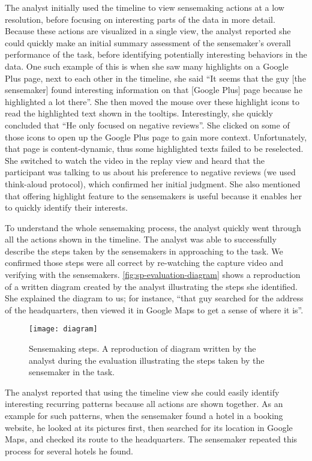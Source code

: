 The analyst initially used the timeline to view sensemaking actions at a low resolution, before focusing on interesting parts of the data in more detail. Because these actions are visualized in a single view, the analyst reported she could quickly make an initial summary assessment of the sensemaker's overall performance of the task, before identifying potentially interesting behaviors in the data. One such example of this is when she saw many highlights on a Google Plus page, next to each other in the timeline, she said ``It seems that the guy [the sensemaker] found interesting information on that [Google Plus] page because he highlighted a lot there''. She then moved the mouse over these highlight icons to read the highlighted text shown in the tooltips. Interestingly, she quickly concluded that ``He only focused on negative reviews''. She clicked on some of those icons to open up the Google Plus page to gain more context. Unfortunately, that page is content-dynamic, thus some highlighted texts failed to be reselected. She switched to watch the video in the replay view and heard that the participant was talking to us about his preference to negative reviews (we used think-aloud protocol), which confirmed her initial judgment. She also mentioned that offering highlight feature to the sensemakers is useful because it enables her to quickly identify their interests.

To understand the whole sensemaking process, the analyst quickly went through all the actions shown in the timeline. The analyst was able to successfully describe the steps taken by the sensemakers in approaching to the task. We confirmed those steps were all correct by re-watching the capture video and verifying with the sensemakers. \autoref{fig:sp-evaluation-diagram} shows a reproduction of a written diagram created by the analyst illustrating the steps she identified. She explained the diagram to us; for instance, ``that guy searched for the address of the headquarters, then viewed it in Google Maps to get a sense of where it is''.

\begin{figure}[ht]
\centering
\texttt{[image: diagram]}
\caption[Sensemaking steps]{Sensemaking steps. A reproduction of diagram written by the analyst during the evaluation illustrating the steps taken by the sensemaker in the task.}
\label{fig:sp-evaluation-diagram}
\end{figure}

The analyst reported that using the timeline view she could easily identify interesting recurring patterns because all actions are shown together. As an example for such patterns, when the sensemaker found a hotel in a booking website, he looked at its pictures first, then searched for its location in Google Maps, and checked its route to the headquarters. The sensemaker repeated this process for several hotels he found.

